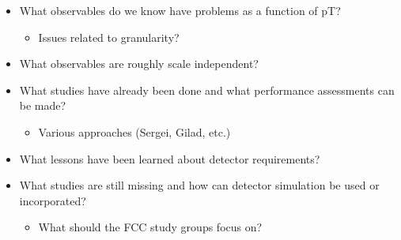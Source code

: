 \label{superboosted}

\begin{itemize}
\item What observables do we know have problems as a function of pT?
\begin{itemize}
	\item Issues related to granularity?
\end{itemize}
\item What observables are roughly scale independent?
\item What studies have already been done and what performance assessments can be made?
\begin{itemize}
	\item Various approaches (Sergei, Gilad, etc.)
\end{itemize}
\item What lessons have been learned about detector requirements?
\item What studies are still missing and how can detector simulation be used or incorporated?
\begin{itemize}
	\item What should the FCC study groups focus on?
\end{itemize}
\end{itemize}